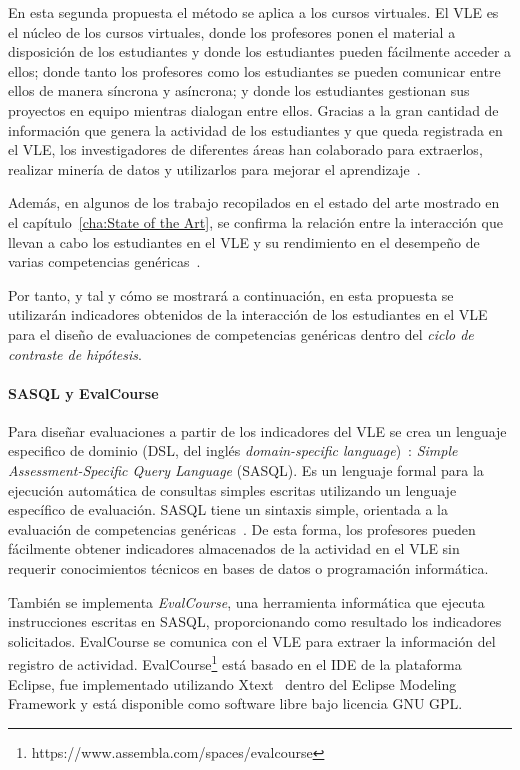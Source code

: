 En esta segunda propuesta el método se aplica a los cursos virtuales. El VLE es el núcleo de los cursos virtuales, donde los profesores ponen el material a disposición de los estudiantes y donde los estudiantes pueden fácilmente acceder a ellos; donde tanto los profesores como los estudiantes se pueden comunicar entre ellos de manera síncrona y asíncrona; y donde los estudiantes gestionan sus proyectos en equipo mientras dialogan entre ellos. Gracias a la gran cantidad de información que genera la actividad de los estudiantes y que queda registrada en el VLE, los investigadores de diferentes áreas han colaborado para extraerlos, realizar minería de datos y utilizarlos para mejorar el aprendizaje~\cite{park2015development}.

Además, en algunos de los trabajo recopilados en el estado del arte mostrado en el capítulo~\ref{cha:State of the Art}, se confirma la relación entre la interacción que llevan a cabo los estudiantes en el VLE y su rendimiento en el desempeño de varias competencias genéricas~\cite{fidalgo:2015,rayon2014web}. 

Por tanto, y tal y cómo se mostrará a continuación, en esta propuesta se utilizarán indicadores obtenidos de la interacción de los estudiantes en el VLE para el diseño de evaluaciones de competencias genéricas dentro del  \emph{ciclo de contraste de hipótesis}.


\paragraph{SASQL y EvalCourse}

Para diseñar evaluaciones a partir de los indicadores del VLE se crea un lenguaje especifico de dominio (DSL, del inglés \emph{domain-specific language})~\cite{vanDeursen:2000}: \emph{Simple Assessment-Specific Query Language} (SASQL). Es un lenguaje formal para la ejecución automática de consultas simples escritas utilizando un lenguaje específico de evaluación. SASQL tiene un sintaxis simple, orientada a la evaluación de competencias genéricas~\cite{Balderas:2013}. De esta forma, los profesores pueden fácilmente obtener indicadores almacenados de la actividad en el VLE sin requerir conocimientos técnicos en bases de datos o programación informática.

También se implementa \emph{EvalCourse}, una herramienta informática que ejecuta instrucciones escritas en SASQL, proporcionando como resultado los indicadores solicitados. EvalCourse se comunica con el VLE para extraer la información del registro de actividad. EvalCourse\footnote{https://www.assembla.com/spaces/evalcourse} está basado en el IDE de la plataforma Eclipse, fue implementado utilizando Xtext~\cite{eysholdt2010xtext} dentro del Eclipse Modeling Framework y está disponible como software libre bajo licencia GNU GPL.

